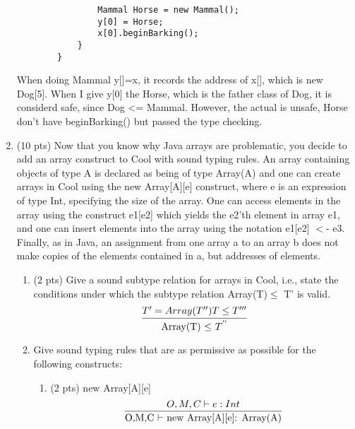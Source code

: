 \documentclass[10pt]{article}
\newcommand{\infertext}[2]{\infer{{\textrm{#1}}}{#2}}
\begin{document}
\begin{enumerate}
\begin{verbatim}
                Mammal Horse = new Mammal();
                y[0] = Horse;                 
                x[0].beginBarking();
            }
        }
\end{verbatim}

When doing  Mammal y[]=x, it records the address of x[], which is new Dog[5]. When I give y[0] the Horse, which is the father class of Dog, it is considerd safe, since Dog <= Mammal. However, the actual is unsafe, Horse don't have beginBarking() but passed the type checking. 

\medskip



\item (10 pts) Now that you know why Java arrays are problematic, you decide to add an array construct
to Cool with sound typing rules. An array containing objects of type A is declared as being of type
\textsf{Array(A)} and one can create arrays in Cool using the \textsf{new Array[A][e]} construct, where \textsf{e} is an
expression of type \textsf{Int}, specifying the size of the array.
One can access elements in the array using
the construct \textsf{e1[e2]} which yields the \textsf{e2}'th element in array \textsf{e1},
and one can insert elements into the array using the notation \textsf{e1[e2] $<$- e3}.
Finally, as in Java, an assignment from one array \textsf{a} to an
array \textsf{b} does not make copies of the elements contained in \textsf{a}, but addresses of elements.

\begin{enumerate}
  \item (2 pts) Give a sound subtype relation for arrays in Cool, i.e., state the conditions under which
the subtype relation \textsf{Array(T)$\le$ T'} is valid.
\\
\[
  \infertext{Array(T) $\leq$ $T^{''}$}{T' = Array(T'') T \leq T'''}
\]




  \item Give sound typing rules that are as permissive as possible for the following constructs:

\begin{enumerate}
    \item (2 pts) \textsf{new Array[A][e]}
    \\
\[
  \infertext{O,M,C $\vdash$ new Array[A][e]: Array(A)}{O,M,C \vdash e: Int}
\]
    

\end{enumerate}
\end{enumerate}
\end{enumerate}
\end{document}
